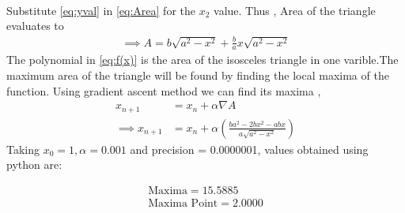 \documentclass[10pt, a4paper]{article}
\providecommand{\brak}[1]{\ensuremath{\left(#1\right)}}
\begin{document}
\\Substitute \eqref{eq:yval} in \eqref{eq:Area} for the $x_2$ value. Thus , Area of the triangle  evaluates to  
\begin{align}
\implies A = b\sqrt{a^2-x^2} + \frac{b}{a}x\sqrt{a^2-x^2}
	\label{eq:f(x)}
\end{align}
The polynomial in \eqref{eq:f(x)} is the area of the isosceles triangle in one varible.The maximum area of the triangle will be found by finding the local maxima of the function.
Using gradient ascent method we can find its maxima ,
    \begin{align}
        x_{n+1} &= x_n + \alpha \nabla A \\
	    \implies x_{n+1} &= x_n + \alpha \brak{\frac{ba^2-2bx^2-abx}{a\sqrt{a^2-x^2}}}
    \end{align}
Taking $x_0=1,\alpha=0.001$ and precision = 0.0000001, values obtained using python are:
    
    \begin{align}
        \boxed{\text{Maxima} = 15.5885}\\
        \boxed{\text{Maxima Point} = 2.0000}
    \end{align}
\end{document}
